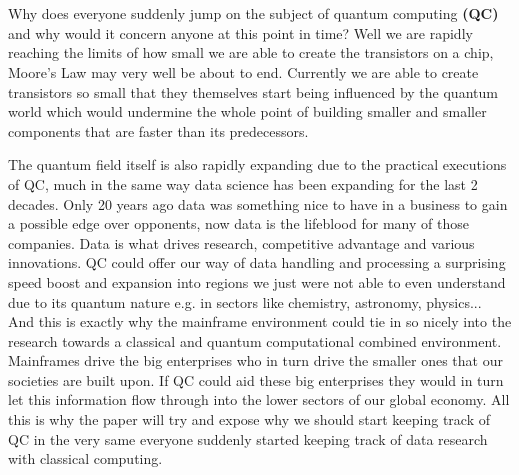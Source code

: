 
\chapter{}
\label{ch:inleiding}

Why does everyone suddenly jump on the subject of quantum computing \textbf{(QC)} and why would it concern anyone at this point in time? Well we are rapidly reaching the limits of how small we are able to create the transistors on a chip, Moore's Law may very well be about to end. Currently we are able to create transistors so small that they themselves start being influenced by the quantum world which would undermine the whole point of building smaller and smaller components that are faster than its predecessors. \autocite{Hartnett2019}

The quantum field itself is also rapidly expanding due to the practical executions of QC, much in the same way data science has been expanding for the last 2 decades. Only 20 years ago data was something nice to have in a business to gain a possible edge over opponents, now data is the lifeblood for many of those companies. Data is what drives research, competitive advantage and various innovations. QC could offer our way of data handling and processing a surprising speed boost and expansion into regions we just were not able to even understand due to its quantum nature e.g. in sectors like chemistry, astronomy, physics...  And this is exactly why the mainframe environment could tie in so nicely into the research towards a classical and quantum computational combined environment. Mainframes drive the big enterprises who in turn drive the smaller ones that our societies are built upon. If QC could aid these big enterprises they would in turn let this information flow through into the lower sectors of our global economy. All this is why the paper will try and expose why we should start keeping track of QC in the very same everyone suddenly started keeping track of data research with classical computing.~\autocite{Google2019} ~\autocite{IBM2019}


\section{}
\label{sec:probleemstelling}


